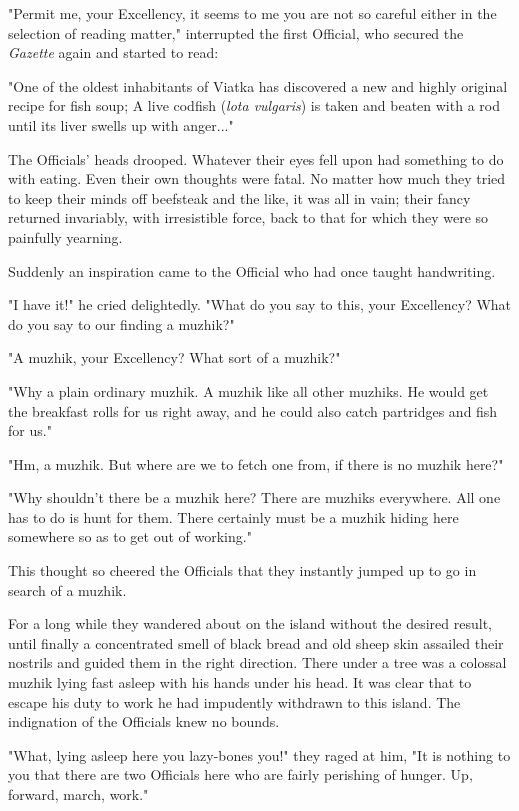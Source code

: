 "Permit me, your Excellency, it seems to me you are not so careful
either in the selection of reading matter," interrupted the first
Official, who secured the \emph{Gazette} again and started to read:

"One of the oldest inhabitants of Viatka has discovered a new and
highly original recipe for fish soup; A live codfish (\emph{lota vulgaris})
is taken and beaten with a rod until its liver swells up with
anger..."

The Officials' heads drooped. Whatever their eyes fell upon had
something to do with eating. Even their own thoughts were fatal. No
matter how much they tried to keep their minds off beefsteak and the
like, it was all in vain; their fancy returned invariably, with
irresistible force, back to that for which they were so painfully
yearning.

Suddenly an inspiration came to the Official who had once taught
handwriting.

"I have it!" he cried delightedly. "What do you say to this, your
Excellency? What do you say to our finding a muzhik?"

"A muzhik, your Excellency? What sort of a muzhik?"

"Why a plain ordinary muzhik. A muzhik like all other muzhiks. He
would get the breakfast rolls for us right away, and he could also
catch partridges and fish for us."

"Hm, a muzhik. But where are we to fetch one from, if there is no
muzhik here?"

"Why shouldn't there be a muzhik here? There are muzhiks everywhere.
All one has to do is hunt for them. There certainly must be a muzhik
hiding here somewhere so as to get out of working."

This thought so cheered the Officials that they instantly jumped up to
go in search of a muzhik.

For a long while they wandered about on the island without the desired
result, until finally a concentrated smell of black bread and old
sheep skin assailed their nostrils and guided them in the right
direction. There under a tree was a colossal muzhik lying fast asleep
with his hands under his head. It was clear that to escape his duty to
work he had impudently withdrawn to this island. The indignation of
the Officials knew no bounds.

"What, lying asleep here you lazy-bones you!" they raged at him, "It
is nothing to you that there are two Officials here who are fairly
perishing of hunger. Up, forward, march, work."

